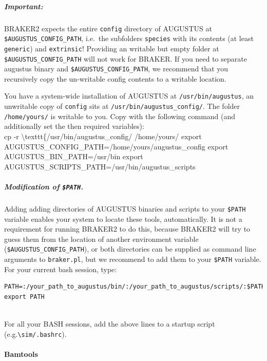 \documentclass[]{article}
\let\oldparagraph\paragraph
\renewcommand{\paragraph}[1]{\oldparagraph{#1}\mbox{}}
\let\oldsubparagraph\subparagraph
\renewcommand{\subparagraph}[1]{\oldsubparagraph{#1}\mbox{}}
\begin{document}
\subparagraph{Important:}\label{important}

BRAKER2 expects the entire \texttt{config} directory of AUGUSTUS at
\texttt{\$AUGUSTUS\_CONFIG\_PATH}, i.e.~the subfolders \texttt{species}
with its contents (at least \texttt{generic}) and \texttt{extrinsic}!
Providing an writable but empty folder at
\texttt{\$AUGUSTUS\_CONFIG\_PATH} will not work for BRAKER. If you need
to separate augustus binary and \texttt{\$AUGUSTUS\_CONFIG\_PATH}, we
recommend that you recursively copy the un-writable config contents to a
writable location.

You have a system-wide installation of AUGUSTUS at
\texttt{/usr/bin/augustus}, an unwritable copy of \texttt{config} sits
at \texttt{/usr/bin/augustus\_config/}. The folder \texttt{/home/yours/}
is writable to you. Copy with the following command (and additionally
set the then required variables):\\
cp -r \textbackslash{}texttt\{/usr/bin/augustus\_config/ /home/yours/
export AUGUSTUS\_CONFIG\_PATH=/home/yours/augustus\_config export
AUGUSTUS\_BIN\_PATH=/usr/bin export
AUGUSTUS\_SCRIPTS\_PATH=/usr/bin/augustus\_scripts

\subparagraph{\texorpdfstring{Modification of
\texttt{\$PATH}.}{Modification of \$PATH.}}\label{modification-of-path.}

Adding adding directories of AUGUSTUS binaries and scripts to your
\texttt{\$PATH} variable enables your system to locate these tools,
automatically. It is not a requirement for running BRAKER2 to do this,
because BRAKER2 will try to guess them from the location of another
environment variable (\texttt{\$AUGUSTUS\_CONFIG\_PATH}), or both
directories can be supplied as command line arguments to
\texttt{braker.pl}, but we recommend to add them to your \texttt{\$PATH}
variable. For your current bash session, type:

\begin{verbatim}
PATH=:/your_path_to_augustus/bin/:/your_path_to_augustus/scripts/:$PATH
export PATH
    
\end{verbatim}

For all your BASH sessions, add the above lines to a startup script
(e.g.\texttt{\textbackslash{}sim/.bashrc}).

\paragraph{Bamtools}\label{bamtools}
\end{document}
